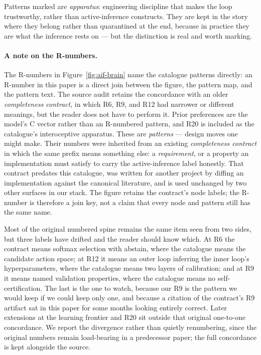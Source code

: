 Patterns marked \apparatusmark{} are \emph{apparatus}: engineering discipline
that makes the loop trustworthy, rather than active-inference constructs.  They
are kept in the story where they belong rather than quarantined at the end,
because in practice they are what the inference rests on --- but the
distinction is real and worth marking.

\paragraph*{A note on the R-numbers.}
\ifdefined\plopearlyoverview
The R-numbers in Figure~\ref{fig:aif-brain} name the catalogue patterns
directly: an R-number in this paper is a direct join between the figure, the
pattern map, and the pattern text.  The source audit retains the concordance
with an older \emph{completeness contract}, in which R6, R9, and R12 had
narrower or different meanings, but the reader does not have to perform it.  Prior
preferences are the model's C vector rather than an R-numbered pattern, and
R20 is included as the catalogue's interoceptive apparatus.
\else
These are \emph{patterns} --- design moves one might make.  Their numbers were inherited from an existing
\emph{completeness contract} in which the same prefix means something else: a
\emph{requirement}, or a property an implementation must satisfy to carry the
active-inference label honestly.  That contract predates this catalogue, was
written for another project by diffing an implementation against the canonical
literature, and is used unchanged by two other surfaces in our stack.  The
figure retains the contract's node labels; the R-number is therefore a join key,
not a claim that every node and pattern still has the same name.

Most of the original numbered spine remains the same item seen from two sides,
but three labels have drifted and the reader should know which.  At R6 the
contract means softmax selection with abstain, where the catalogue means the
candidate action space; at R12 it means an outer loop inferring the inner loop's
hyperparameters, where the catalogue means two layers of calibration; and at R9
it means named validation properties, where the catalogue means no
self-certification.  The last is the one to watch, because our R9 is the pattern
we would keep if we could keep only one, and because a citation of the contract's
R9 artifact sat in this paper for some months looking entirely correct.  Later
extensions at the learning frontier and R20 sit outside that original
one-to-one concordance.  We report the divergence rather than quietly
renumbering, since the original numbers remain load-bearing in a predecessor
paper; the full concordance is kept alongside the source.
\fi

